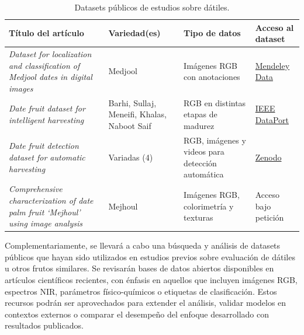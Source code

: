 \begin{table}[h]
\centering
\begin{tabular}{|p{5cm}|p{2.5cm}|p{3cm}|p{4cm}|}
\hline
\textbf{Título del artículo} & \textbf{Variedad(es)} & \textbf{Tipo de datos} & \textbf{Acceso al dataset} \\
\hline

\textit{Dataset for localization and classification of Medjool dates in digital images} \newline \parencite{perez-perez_dataset_2021} & Medjool & Imágenes RGB con anotaciones & \href{https://data.mendeley.com/datasets/872xk9npmz/1}{Mendeley Data} \\

\hline

\textit{Date fruit dataset for intelligent harvesting} \newline \parencite{altaheri_date_2019} & Barhi, Sullaj, Meneifi, Khalas, Naboot Saif & RGB en distintas etapas de madurez & \href{https://ieee-dataport.org/open-access/date-fruit-dataset-automated-harvesting-and-visual-yield-estimation}{IEEE DataPort} \\

\hline

\textit{Date fruit detection dataset for automatic harvesting} \newline \parencite{zarouit_date_2024} & Variadas (4) & RGB, imágenes y videos para detección automática & \href{https://zenodo.org/records/10143465}{Zenodo} \\

\hline

\textit{Comprehensive characterization of date palm fruit ‘Mejhoul’ using image analysis} \newline \parencite{noutfia_comprehensive_2022} & Mejhoul & Imágenes RGB, colorimetría y texturas & Acceso bajo petición \\

\hline

\end{tabular}
\caption{Datasets públicos de estudios sobre dátiles.}
\label{tab:datasets}
\end{table}

Complementariamente, se llevará a cabo una búsqueda y análisis de datasets públicos que hayan sido utilizados en estudios previos sobre evaluación de dátiles u otros frutos similares. Se revisarán bases de datos abiertos disponibles en artículos científicos recientes, con énfasis en aquellos que incluyen imágenes RGB, espectros NIR, parámetros físico-químicos o etiquetas de clasificación. Estos recursos podrán ser aprovechados para extender el análisis, validar modelos en contextos externos o comparar el desempeño del enfoque desarrollado con resultados publicados.\\

